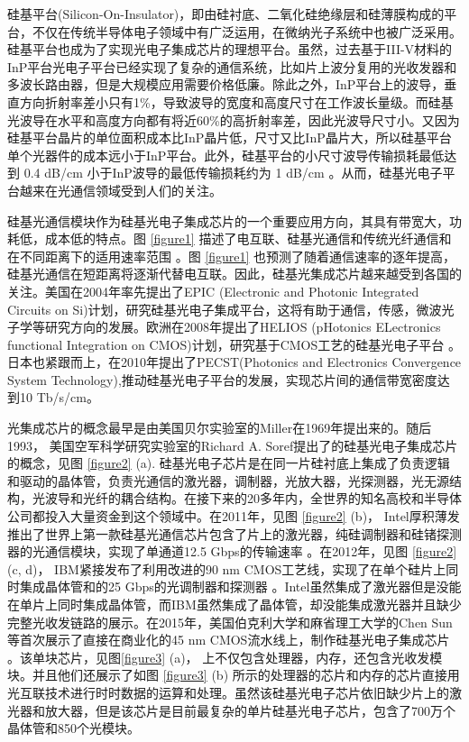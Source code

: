 硅基平台(Silicon-On-Insulator)，即由硅衬底、二氧化硅绝缘层和硅薄膜构成的平台，不仅在传统半导体电子领域中有广泛运用，在微纳光子系统中也被广泛采用。硅基平台也成为了实现光电子集成芯片的理想平台。虽然，过去基于III-V材料的InP平台光电子平台已经实现了复杂的通信系统\cite{Meint2014an}，比如片上波分复用的光收发器和多波长路由器，但是大规模应用需要价格低廉。除此之外，InP平台上的波导，垂直方向折射率差小只有1\%，导致波导的宽度和高度尺寸在工作波长量级。而硅基光波导在水平和高度方向都有将近60\%的高折射率差，因此光波导尺寸小。又因为硅基平台晶片的单位面积成本比InP晶片低，尺寸又比InP晶片大，所以硅基平台单个光器件的成本远小于InP平台。此外，硅基平台的小尺寸波导传输损耗最低达到 0.4 dB/cm \cite{Tsuyoshi2016low} 小于InP波导的最低传输损耗约为 1 dB/cm \cite{Meint2014an}。从而，硅基光电子平台越来在光通信领域受到人们的关注。

硅基光通信模块作为硅基光电子集成芯片的一个重要应用方向，其具有带宽大，功耗低，成本低的特点。图 \ref{figure1} 描述了电互联、硅基光通信和传统光纤通信和在不同距离下的适用速率范围 \cite{Zuffada2012}。图 \ref{figure1} 也预测了随着通信速率的逐年提高，硅基光通信在短距离将逐渐代替电互联。因此，硅基光集成芯片越来越受到各国的关注。美国在2004年率先提出了EPIC (Electronic and Photonic Integrated Circuits on Si)计划，研究硅基光电子集成平台，这将有助于通信，传感，微波光子学等研究方向的发展\cite{Shah2005}。欧洲在2008年提出了HELIOS (pHotonics ELectronics functional Integration on CMOS)计划，研究基于CMOS工艺的硅基光电子平台 \cite{HELIOS}。日本也紧跟而上，在2010年提出了PECST(Photonics and Electronics Convergence System Technology),推动硅基光电子平台的发展，实现芯片间的通信带宽密度达到10 Tb/s/cm\cite{Arakawa2013Silicon}。

光集成芯片的概念最早是由美国贝尔实验室的Miller在1969年提出来的\cite{miller1969}。随后1993， 美国空军科学研究实验室的Richard A. Soref提出了的硅基光电子集成芯片的概念\cite{Soref1993}，见图 \ref{figure2} (a). 硅基光电子芯片是在同一片硅衬底上集成了负责逻辑和驱动的晶体管，负责光通信的激光器，调制器，光放大器，光探测器，光无源结构，光波导和光纤的耦合结构。在接下来的20多年内，全世界的知名高校和半导体公司都投入大量资金到这个领域中。在2011年，见图 \ref{figure2} (b)， Intel厚积薄发推出了世界上第一款硅基光通信芯片包含了片上的激光器，纯硅调制器和硅锗探测器的光通信模块，实现了单通道12.5 Gbps的传输速率 \cite{Paniccia2011}。在2012年，见图 \ref{figure2} (c, d)， IBM紧接发布了利用改进的90 nm CMOS工艺线，实现了在单个硅片上同时集成晶体管和的25 Gbps的光调制器和探测器 \cite{Assefa2012}。Intel虽然集成了激光器但是没能在单片上同时集成晶体管，而IBM虽然集成了晶体管，却没能集成激光器并且缺少完整光收发链路的展示。在2015年，美国伯克利大学和麻省理工大学的Chen Sun等首次展示了直接在商业化的45 nm CMOS流水线上，制作硅基光电子集成芯片 \cite{sun2015single}。该单块芯片，见图\ref{figure3} (a)， 上不仅包含处理器，内存，还包含光收发模块。并且他们还展示了如图 \ref{figure3} (b) 所示的处理器的芯片和内存的芯片直接用光互联技术进行时时数据的运算和处理。虽然该硅基光电子芯片依旧缺少片上的激光器和放大器，但是该芯片是目前最复杂的单片硅基光电子芯片，包含了700万个晶体管和850个光模块。

